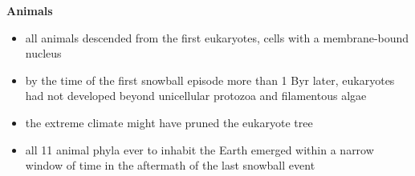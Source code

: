 \textbf{Animals}
\begin{itemize}
	\item all animals descended from the first eukaryotes, cells with a
	membrane-bound nucleus
	\item by the time of the first snowball episode more than 1 Byr later,
	eukaryotes had not developed beyond unicellular protozoa and
	filamentous algae
	\item the extreme climate might have pruned the eukaryote tree
	\item all 11 animal phyla ever to inhabit the Earth emerged within a
	narrow window of time in the aftermath of the last snowball event
\end{itemize}

